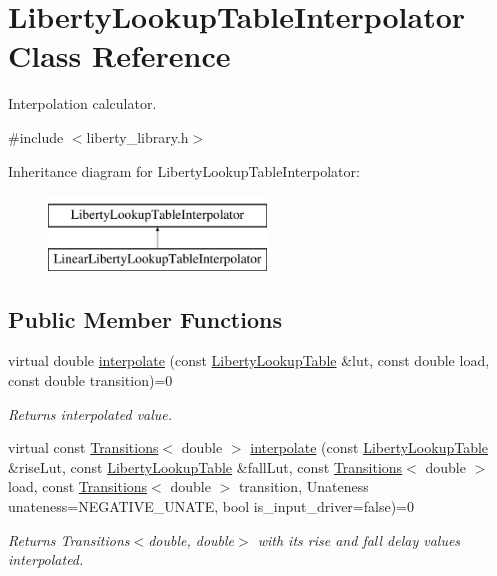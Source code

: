 \hypertarget{classLibertyLookupTableInterpolator}{\section{Liberty\-Lookup\-Table\-Interpolator Class Reference}
\label{classLibertyLookupTableInterpolator}
}


Interpolation calculator.  




{\ttfamily \#include $<$liberty\-\_\-library.\-h$>$}

Inheritance diagram for Liberty\-Lookup\-Table\-Interpolator\-:\begin{figure}[H]
\begin{center}
\leavevmode
\includegraphics[height=2.000000cm]{classLibertyLookupTableInterpolator}
\end{center}
\end{figure}
\subsection*{Public Member Functions}
\begin{DoxyCompactItemize}
\item 
virtual double \hyperlink{classLibertyLookupTableInterpolator_ae12e0b9e427488bc933b54a427586f47}{interpolate} (const \hyperlink{structLibertyLookupTable}{Liberty\-Lookup\-Table} \&lut, const double load, const double transition)=0
\begin{DoxyCompactList}\small\item\em Returns interpolated value. \end{DoxyCompactList}\item 
virtual const \hyperlink{classTransitions}{Transitions}$<$ double $>$ \hyperlink{classLibertyLookupTableInterpolator_a3f840a4246b193e9e620b3ec8cadb720}{interpolate} (const \hyperlink{structLibertyLookupTable}{Liberty\-Lookup\-Table} \&rise\-Lut, const \hyperlink{structLibertyLookupTable}{Liberty\-Lookup\-Table} \&fall\-Lut, const \hyperlink{classTransitions}{Transitions}$<$ double $>$ load, const \hyperlink{classTransitions}{Transitions}$<$ double $>$ transition, Unateness unateness=N\-E\-G\-A\-T\-I\-V\-E\-\_\-\-U\-N\-A\-T\-E, bool is\-\_\-input\-\_\-driver=false)=0
\begin{DoxyCompactList}\small\item\em Returns Transitions$<$double, double$>$ with its rise and fall delay values interpolated. \end{DoxyCompactList}\end{DoxyCompactItemize}
